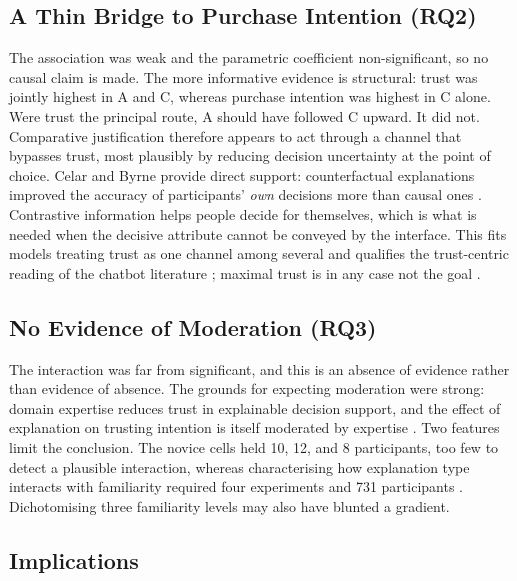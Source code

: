 \documentclass[conference]{IEEEtran}
\begin{document}
\subsection{A Thin Bridge to Purchase Intention (RQ2)}

The association was weak and the parametric coefficient non-significant, so no causal claim
is made. The more informative evidence is structural: trust was jointly highest in A and C,
whereas purchase intention was highest in C alone. Were trust the principal route, A should
have followed C upward. It did not. Comparative justification therefore appears to act
through a channel that bypasses trust, most plausibly by reducing decision uncertainty at
the point of choice. Celar and Byrne provide direct support: counterfactual explanations
improved the accuracy of participants' \textit{own} decisions more than causal ones
\cite{celar2023}. Contrastive information helps people decide for themselves, which is what
is needed when the decisive attribute cannot be conveyed by the interface. This fits models
treating trust as one channel among several \cite{liyang2025} and qualifies the
trust-centric reading of the chatbot literature \cite{yen2021}; maximal trust is in any
case not the goal \cite{naiseh2021}.

\subsection{No Evidence of Moderation (RQ3)}

The interaction was far from significant, and this is an absence of evidence rather than
evidence of absence. The grounds for expecting moderation were strong: domain expertise
reduces trust in explainable decision support, and the effect of explanation on trusting
intention is itself moderated by expertise \cite{bayer2023}. Two features limit the
conclusion. The novice cells held 10, 12, and 8 participants, too few to detect a plausible
interaction, whereas characterising how explanation type interacts with familiarity
required four experiments and 731 participants \cite{celar2023}. Dichotomising three
familiarity levels may also have blunted a gradient.

\subsection{Implications}
\end{document}
